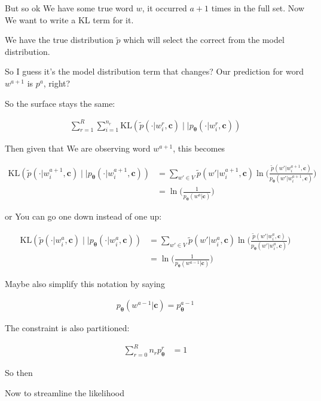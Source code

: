 \documentclass{article}
\newcommand{\KL}{\mathrm{KL}}
\newcommand{\vtheta}{\boldsymbol{\theta}}
\newcommand{\model}{p_{\vtheta}}
\newcommand{\context}{\boldsymbol{c}}
\begin{document}
			But so ok We have some true word $w$, it occurred $a+1$ times in the full set. Now We want to write a KL term for it.
			
			We have the true distribution $\tilde{p}$ which will select the correct from the model distribution.
			
			So I guess it's the model distribution term that changes? Our prediction for word $w^{a+1}$ is $p^a$, right?
			
			So the surface stays the same: 
			
			\begin{align}
				\sum^R_{r=1} \sum^{n_r}_{i=1} \KL( \tilde{p}(\cdot|w^r_i,\context)\mid\mid \model(\cdot | w^r_i,\context))
			\end{align}
			
			Then given that We are observing word $w^{a+1}$, this becomes
			
			\begin{align}
				\KL( \tilde{p}(\cdot|w^{a+1}_i,\context)\mid\mid \model(\cdot | w^{a+1}_i,\context)) &= \sum_{w'\in V} \tilde{p}( w' |w^{a+1}_i,\context) \ln\bigg(\frac{\tilde{p}( w' |w^{a+1}_i,\context)}{\model( w' |w^{a+1}_i,\context)} \bigg)\\
				&= \ln\bigg(\frac{1}{\model(w^a|\context)} \bigg)
			\end{align}
			
			or You can go one down instead of one up:
			
			\begin{align}
				\KL( \tilde{p}(\cdot|w^{a}_i,\context)\mid\mid \model(\cdot | w^{a}_i,\context)) &= \sum_{w'\in V} \tilde{p}( w' |w^{a}_i,\context) \ln\bigg(\frac{\tilde{p}( w' |w^{a}_i,\context)}{\model( w' |w^{a}_i,\context)} \bigg)\\
				&= \ln\bigg(\frac{1}{\model(w^{a-1}|\context)} \bigg)
			\end{align}
			
			Maybe also simplify this notation by saying
			
			\begin{align}
				\model(w^{a-1}|\context) = \model^{a-1}
			\end{align}
			
			The constraint is also partitioned:
			
			\begin{align}
				\sum^{R}_{r=0} n_r \model^r &= 1
			\end{align}
			
			So then
			
			Now to streamline the likelihood
			
\end{document}
